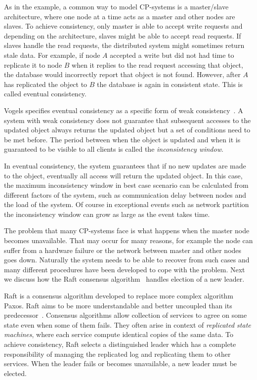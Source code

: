 As in the example, a common way to model CP-systems is a master/slave
architecture, where one node at a time acts as a master and other nodes are
slaves. To achieve consistency, only master is able to accept write requests and
depending on the architecture, slaves might be able to accept read requests. If
slaves handle the read requests, the distributed system might sometimes return
stale data. For example, if node \(A\) accepted a write but did not had time to
replicate it to node \(B\) when it replies to the read request accessing that
object, the database would incorrectly report that object is not found. However,
after \(A\) has replicated the object to \(B\) the database is again in
consistent state. This is called eventual consistency.

Vogels specifies eventual consistency as a specific form of weak
consistency~\cite{vogels2009eventually}. A system with weak consistency does not
guarantee that subsequent accesses to the updated object always returns the
updated object but a set of conditions need to be met before. The period between
when the object is updated and when it is guaranteed to be visible to all
clients is called the \emph{inconsistency window}.

In eventual consistency, the system guarantees that if no new updates are made
to the object, eventually all access will return the updated object. In this
case, the maximum inconsistency window in best case scenario can be calculated
from different factors of the system, such as communication delay between nodes
and the load of the system. Of course in exceptional events such as network
partition the inconsistency window can grow as large as the event takes time.

The problem that many CP-systems face is what happens when the master node
becomes unavailable. That may occur for many reasons, for example the node can
suffer from a hardware failure or the network between master and other nodes
goes down. Naturally the system needs to be able to recover from such cases and
many different procedures have been developed to cope with the problem. Next we
discuss how the Raft consensus algorithm~\cite{ongaro2014search} handles
election of a new leader.

Raft is a consensus algorithm developed to replace more complex algorithm Paxos.
Raft aims to be more understandable and better uncoupled than its
predecessor~\cite{ongaro2014search}. Consensus algorithms allow collection of
services to agree on some state even when some of them fails. They often arise
in context of \emph{replicated state machines}, where each service compute
identical copies of the same data. To achieve consistency, Raft selects a
distinguished leader which has a complete responsibility of managing the
replicated log and replicating them to other services. When the leader fails or
becomes unavailable, a new leader must be elected.

